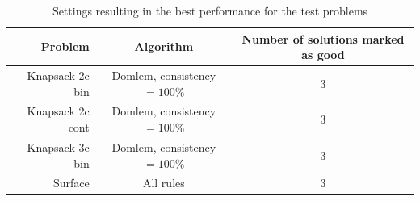 \begin{table}[h]
  \centering
  \begin{tabular}{r c c}
    \hline
    Problem & Algorithm & Number of solutions marked as good \\
    \hline
    Knapsack 2c bin & Domlem, consistency $= 100\%$ & 3 \\
    Knapsack 2c cont & Domlem, consistency $= 100\%$ & 3 \\
    Knapsack 3c bin & Domlem, consistency $= 100\%$ & 3 \\
    Surface & All rules & 3 \\
    \hline
  \end{tabular}
  \caption{Settings resulting in the best performance for the test problems}
  \label{t:best1_conf}
\end{table} 


